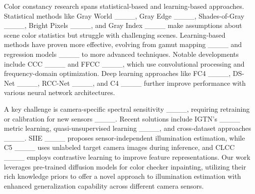 % 
Color constancy research spans statistical-based and learning-based approaches. Statistical methods like Gray World ____, Gray Edge ____, Shades-of-Gray ____, Bright Pixels ____, and Gray Index ____ make assumptions about scene color statistics but struggle with challenging scenes.
% 
Learning-based methods have proven more effective, evolving from gamut mapping ____ and regression models ____ to more advanced techniques. Notable developments include CCC ____ and FFCC ____, which use convolutional processing and frequency-domain optimization. Deep learning approaches like FC4 ____, DS-Net ____, RCC-Net ____, and C4 ____ further improve performance with various neural network architectures. 

A key challenge is camera-specific spectral sensitivity ____, requiring retraining or calibration for new sensors ____. Recent solutions include IGTN's ____ metric learning, quasi-unsupervised learning ____, and cross-dataset approaches ____. SIIE ____ proposes sensor-independent illumination estimation, while C5 ____ uses unlabeled target camera images during inference, and CLCC ____ employs contrastive learning to improve feature representations. Our work leverages pre-trained diffusion models for color checker inpainting, utilizing their rich knowledge priors to offer a novel approach to illumination estimation with enhanced generalization capability across different camera sensors.

